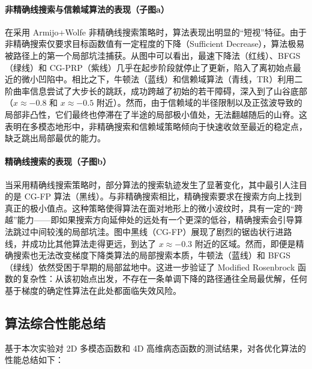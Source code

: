 \documentclass[a4paper,12pt]{article}
\begin{document}
\paragraph{非精确线搜索与信赖域算法的表现（子图a）}
在采用 Armijo+Wolfe 非精确线搜索策略时，算法表现出明显的“短视”特征。由于非精确搜索仅要求目标函数值有一定程度的下降（Sufficient Decrease），算法极易被路径上的第一个局部坑洼捕获。从图中可以看出，最速下降法（红线）、BFGS（绿线）和 CG-PRP（紫线）几乎在起步阶段就停止了更新，陷入了离初始点最近的微小凹陷中。相比之下，牛顿法（蓝线）和信赖域算法（青线，TR）利用二阶曲率信息尝试了大步长的跳跃，成功跨越了初始的若干障碍，深入到了山谷底部（$x \approx -0.8$ 和 $x \approx -0.5$ 附近）。然而，由于信赖域的半径限制以及正弦波导致的局部非凸性，它们最终也停滞在了半途的局部极小值处，无法翻越随后的山脊。这表明在多模态地形中，非精确搜索和信赖域策略倾向于快速收敛至最近的稳定点，缺乏跳出局部最优的能力。

\paragraph{精确线搜索的表现（子图b）}
当采用精确线搜索策略时，部分算法的搜索轨迹发生了显著变化，其中最引人注目的是 CG-FP 算法（黑线）。与非精确搜索相比，精确搜索要求在搜索方向上找到真正的极小值点。这种策略使得算法在面对地形上的微小波纹时，具有一定的“跨越”能力——即如果搜索方向延伸处的远处有一个更深的低谷，精确搜索会引导算法跳过中间较浅的局部坑洼。图中黑线（CG-FP）展现了剧烈的锯齿状行进路线，并成功比其他算法走得更远，到达了 $x \approx -0.3$ 附近的区域。然而，即便是精确搜索也无法改变梯度下降类算法的局部搜索本质，牛顿法（蓝线）和 BFGS（绿线）依然受困于早期的局部盆地中。这进一步验证了 Modified Rosenbrock 函数的复杂性：从该初始点出发，不存在一条单调下降的路径通往全局最优解，任何基于梯度的确定性算法在此处都面临失效风险。

\subsection{算法综合性能总结}

基于本次实验对 2D 多模态函数和 4D 高维病态函数的测试结果，对各优化算法的性能总结如下：
\end{document}
